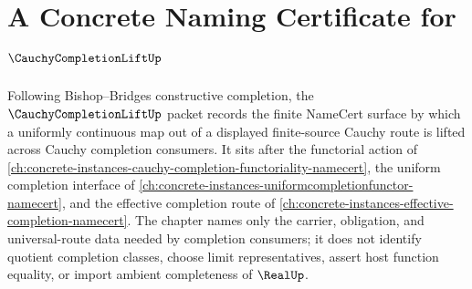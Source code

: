 \chapter{A Concrete Naming Certificate for $\CauchyCompletionLiftUp$}
\label{ch:concrete-instances-cauchy-completion-lift-namecert}

Following Bishop--Bridges constructive completion, the $\CauchyCompletionLiftUp$ packet records the finite NameCert surface by which a uniformly continuous map out of a displayed finite-source Cauchy route is lifted across Cauchy completion consumers. It sits after the functorial action of \autoref{ch:concrete-instances-cauchy-completion-functoriality-namecert}, the uniform completion interface of \autoref{ch:concrete-instances-uniformcompletionfunctor-namecert}, and the effective completion route of \autoref{ch:concrete-instances-effective-completion-namecert}. The chapter names only the carrier, obligation, and universal-route data needed by completion consumers; it does not identify quotient completion classes, choose limit representatives, assert host function equality, or import ambient completeness of $\RealUp$.

